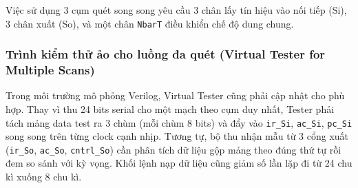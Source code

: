 Việc sử dụng 3 cụm quét song song yêu cầu 3 chân lấy tín hiệu vào nối tiếp (Si), 3 chân xuất (So), và một chân \texttt{NbarT} điều khiển chế độ dung chung.

\subsubsection{Trình kiểm thử ảo cho luồng đa quét (Virtual Tester for Multiple Scans)}
Trong môi trường mô phỏng Verilog, Virtual Tester cũng phải cập nhật cho phù hợp. Thay vì thu 24 bits serial cho một mạch theo cụm duy nhất, Tester phải tách mảng data test ra 3 chùm (mỗi chùm 8 bits) và đẩy vào \texttt{ir\_Si}, \texttt{ac\_Si}, \texttt{pc\_Si} song song trên từng clock cạnh nhịp. Tương tự, bộ thu nhận mẫu từ 3 cổng xuất (\texttt{ir\_So}, \texttt{ac\_So}, \texttt{cntrl\_So}) cần phân tích dữ liệu gộp mảng theo đúng thứ tự rồi đem so sánh với kỳ vọng.
Khối lệnh nạp dữ liệu cũng giảm số lần lặp đi từ 24 chu kì xuống 8 chu kì.
